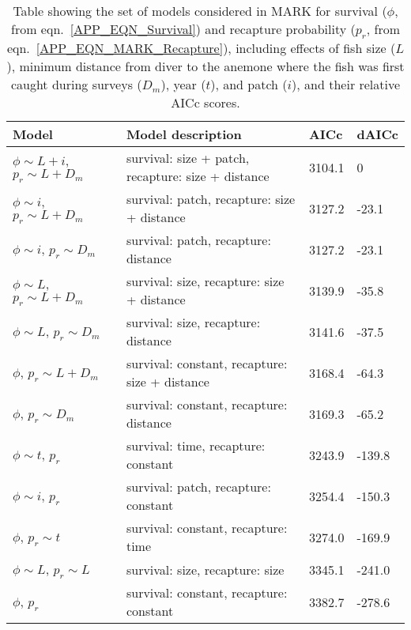 \documentclass[12pt, oneside]{article}   	%
\begin{document}
\begin{table}[!htbp]
\begin{centering}
\caption{Table showing the set of models considered in MARK for survival ($\phi$, from eqn.\ \ref{APP_EQN_Survival}) and recapture probability ($p_r$, from eqn.\ \ref{APP_EQN_MARK_Recapture}), including effects of fish size ($L$), minimum distance from diver to the anemone where the fish was first caught during surveys ($D_m$), year ($t$), and patch ($i$), and their relative AICc scores.}\label{APP_TAB_MARKmodels}
\begin{tabular}{|p{1.75in}|p{2.75in}|p{0.75in}|p{0.75in}|}
\hline 
\textbf{Model} & \textbf{Model description} & \textbf{AICc} & \textbf{dAICc} \\ \hline
$\phi \sim L+i$, $p_r \sim L+D_m$ & survival: size + patch, recapture: size + distance & 3104.1 & 0 \\ \hline
$\phi \sim i$, $p_r \sim L+D_m$ & survival: patch, recapture: size + distance & 3127.2 & -23.1 \\ \hline
$\phi \sim i$, $p_r \sim D_m$ & survival: patch, recapture: distance & 3127.2 & -23.1 \\ \hline
$\phi \sim L$, $p_r \sim L+D_m$ & survival: size, recapture: size + distance & 3139.9 & -35.8 \\ \hline
$\phi \sim L$, $p_r \sim D_m$ & survival: size, recapture: distance & 3141.6 & -37.5 \\ \hline
$\phi$, $p_r \sim L+D_m$ & survival: constant, recapture: size + distance & 3168.4 & -64.3 \\ \hline
$\phi$, $p_r \sim D_m$ & survival: constant, recapture: distance & 3169.3 & -65.2 \\ \hline
$\phi \sim t$, $p_r$ & survival: time, recapture: constant & 3243.9 & -139.8 \\ \hline
$\phi \sim i$, $p_r$ & survival: patch, recapture: constant & 3254.4 & -150.3 \\ \hline
$\phi$, $p_r \sim t$ & survival: constant, recapture: time & 3274.0 & -169.9 \\ \hline
$\phi \sim L$, $p_r \sim L$ & survival: size, recapture: size & 3345.1 & -241.0 \\ \hline
$\phi$, $p_r$ & survival: constant, recapture: constant & 3382.7 & -278.6 \\ \hline
\end{tabular}
\end{centering}
\end{table}
\end{document}
